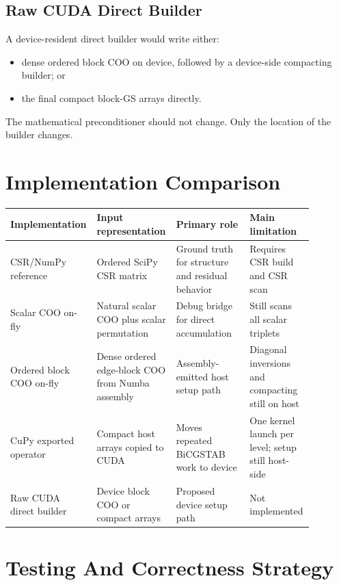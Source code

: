 \documentclass[11pt]{article}
\begin{document}
\subsection{Raw CUDA Direct Builder}

A device-resident direct builder would write either:
\begin{itemize}[nosep]
  \item dense ordered block COO on device, followed by a device-side compacting
        builder; or
  \item the final compact block-GS arrays directly.
\end{itemize}
The mathematical preconditioner should not change.  Only the location of the
builder changes.

\section{Implementation Comparison}

\begin{center}
\begin{tabular}{p{0.20\linewidth}p{0.24\linewidth}p{0.24\linewidth}p{0.20\linewidth}}
\toprule
Implementation & Input representation & Primary role & Main limitation \\
\midrule
CSR/NumPy reference & Ordered SciPy CSR matrix & Ground truth for structure and residual behavior & Requires CSR build and CSR scan \\
Scalar COO on-fly & Natural scalar COO plus scalar permutation & Debug bridge for direct accumulation & Still scans all scalar triplets \\
Ordered block COO on-fly & Dense ordered edge-block COO from Numba assembly & Assembly-emitted host setup path & Diagonal inversions and compacting still on host \\
CuPy exported operator & Compact host arrays copied to CUDA & Moves repeated BiCGSTAB work to device & One kernel launch per level; setup still host-side \\
Raw CUDA direct builder & Device block COO or compact arrays & Proposed device setup path & Not implemented \\
\bottomrule
\end{tabular}
\end{center}

\section{Testing And Correctness Strategy}
\label{sec:testing}
\end{document}
